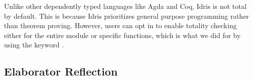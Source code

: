 Unlike other dependently typed languages like Agda and Coq, Idris is not total
by default. This is because Idris prioritizes general purpose programming
rather than theorem proving. However, users can opt in to enable totality
checking either for the entire module or specific functions, which is what we did for  by using the keyword .

\subsection{Elaborator Reflection} \label{ssec:elabref}
